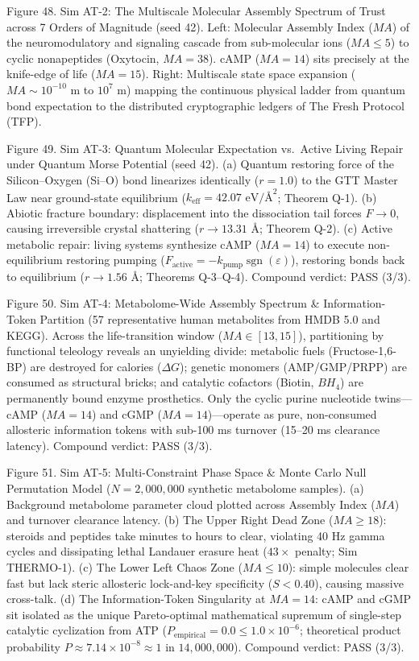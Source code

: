 \documentclass[
]{article}
\begin{document}
Figure 48. Sim AT-2: The Multiscale Molecular Assembly Spectrum of Trust
across 7 Orders of Magnitude (seed 42). Left: Molecular Assembly Index
(\(MA\)) of the neuromodulatory and signaling cascade from sub-molecular
ions (\(MA \le 5\)) to cyclic nonapeptides (Oxytocin, \(MA = 38\)). cAMP
(\(MA = 14\)) sits precisely at the knife-edge of life (\(MA = 15\)).
Right: Multiscale state space expansion (\(MA \sim 10^{-10}\text{ m}\)
to \(10^{7}\text{ m}\)) mapping the continuous physical ladder from
quantum bond expectation to the distributed cryptographic ledgers of The
Fresh Protocol (TFP).

Figure 49. Sim AT-3: Quantum Molecular Expectation vs.~Active Living
Repair under Quantum Morse Potential (seed 42). (a) Quantum restoring
force of the Silicon--Oxygen (Si--O) bond linearizes identically
(\(r = 1.0\)) to the GTT Master Law near ground-state equilibrium
(\(k_{\mathrm{eff}} = 42.07\text{ eV/\AA}^2\); Theorem Q-1). (b) Abiotic
fracture boundary: displacement into the dissociation tail forces
\(F \to 0\), causing irreversible crystal shattering
(\(r \to 13.31\text{ \AA}\); Theorem Q-2). (c) Active metabolic repair:
living systems synthesize cAMP (\(MA=14\)) to execute non-equilibrium
restoring pumping
(\(F_{\mathrm{active}} = -k_{\mathrm{pump}}\operatorname{sgn}(\varepsilon)\)),
restoring bonds back to equilibrium (\(r \to 1.56\text{ \AA}\); Theorems
Q-3--Q-4). Compound verdict: PASS (3/3).

Figure 50. Sim AT-4: Metabolome-Wide Assembly Spectrum \&
Information-Token Partition (57 representative human metabolites from
HMDB 5.0 and KEGG). Across the life-transition window
(\(MA \in [13, 15]\)), partitioning by functional teleology reveals an
unyielding divide: metabolic fuels (Fructose-1,6-BP) are destroyed for
calories (\(\Delta G\)); genetic monomers (AMP/GMP/PRPP) are consumed as
structural bricks; and catalytic cofactors (Biotin, \(BH_4\)) are
permanently bound enzyme prosthetics. Only the cyclic purine nucleotide
twins---cAMP (\(MA=14\)) and cGMP (\(MA=14\))---operate as pure,
non-consumed allosteric information tokens with sub-100 ms turnover
(15--20 ms clearance latency). Compound verdict: PASS (3/3).

Figure 51. Sim AT-5: Multi-Constraint Phase Space \& Monte Carlo Null
Permutation Model (\(N = 2,000,000\) synthetic metabolome samples). (a)
Background metabolome parameter cloud plotted across Assembly Index
(\(MA\)) and turnover clearance latency. (b) The Upper Right Dead Zone
(\(MA \ge 18\)): steroids and peptides take minutes to hours to clear,
violating 40 Hz gamma cycles and dissipating lethal Landauer erasure
heat (\(43\times\) penalty; Sim THERMO-1). (c) The Lower Left Chaos Zone
(\(MA \le 10\)): simple molecules clear fast but lack steric allosteric
lock-and-key specificity (\(S < 0.40\)), causing massive cross-talk. (d)
The Information-Token Singularity at \(MA = 14\): cAMP and cGMP sit
isolated as the unique Pareto-optimal mathematical supremum of
single-step catalytic cyclization from ATP
(\(P_{\mathrm{empirical}} = 0.0 \le 1.0 \times 10^{-6}\); theoretical
product probability
\(P \approx 7.14 \times 10^{-8} \approx 1\text{ in } 14,000,000\)).
Compound verdict: PASS (3/3).
\end{document}
